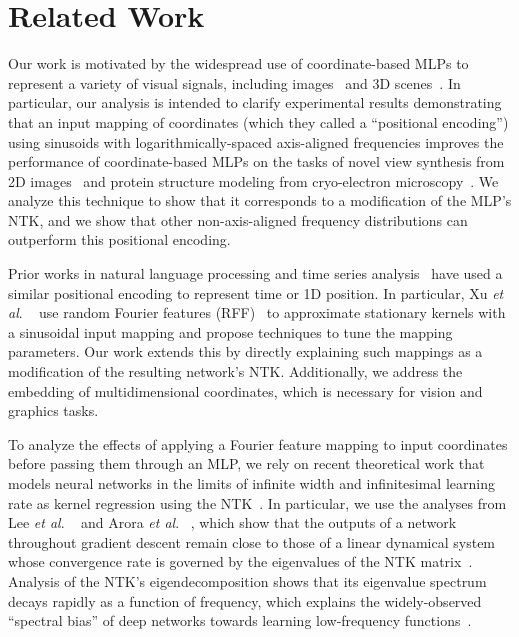 \section{Related Work}

Our work is motivated by the widespread use of coordinate-based MLPs to represent a variety of visual signals, including images~\cite{stanley2007compositional} and 3D scenes~\cite{occupancynet,mildenhall2020nerf,deepsdf}. In particular, our analysis is intended to clarify experimental results demonstrating that an input mapping of coordinates (which they called a ``positional encoding'') using sinusoids with logarithmically-spaced axis-aligned frequencies improves the performance of coordinate-based MLPs on the tasks of novel view synthesis from 2D images~\cite{mildenhall2020nerf} and protein structure modeling from cryo-electron microscopy~\cite{Zhong2020Reconstructing}. We analyze this technique to show that it corresponds to a modification of the MLP's NTK, and we show that other non-axis-aligned frequency distributions can outperform this positional encoding. 

Prior works in natural language processing and time series analysis~\cite{kazemi2019time2vec,vaswani2017attention, xu2019selfattention} have used a similar positional encoding to represent time or 1D position. In particular, Xu \textit{et al}. ~\cite{xu2019selfattention} use random Fourier features (RFF)~\cite{rahimi2007} to approximate stationary kernels with a sinusoidal input mapping and propose techniques to tune the mapping parameters. Our work extends this by directly explaining such mappings as a modification of the resulting network's NTK. Additionally, we address the embedding of multidimensional coordinates, which is necessary for vision and graphics tasks.

To analyze the effects of applying a Fourier feature mapping to input coordinates before passing them through an MLP, we rely on recent theoretical work that models neural networks in the limits of infinite width and infinitesimal learning rate as kernel regression using the NTK~\cite{arora2019finegrained,bietti2019inductive,du19,jacot2018neural,lee2019wide}. In particular, we use the analyses from Lee \textit{et al}. ~\cite{lee2019wide} and Arora \textit{et al}. ~\cite{arora2019finegrained}, which show that the outputs of a network throughout gradient descent remain close to those of a linear dynamical system whose convergence rate is governed by the eigenvalues of the NTK matrix~\cite{arora2019finegrained,basri2020frequency,bietti2019inductive,lee2019wide,yang2019fine}. Analysis of the NTK's eigendecomposition shows that its eigenvalue spectrum decays rapidly as a function of frequency, which explains the widely-observed ``spectral bias'' of deep networks towards learning low-frequency functions~\cite{basri2020frequency,basri2019convergence,rahaman2018spectral}.

